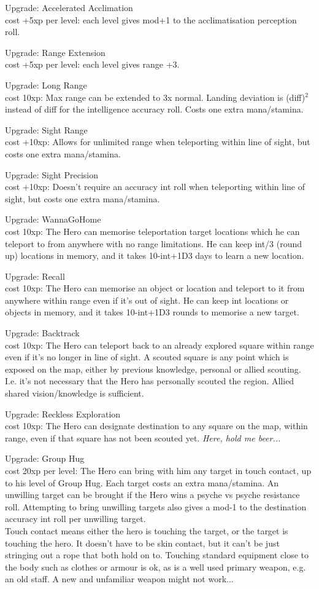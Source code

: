 Upgrade: Accelerated Acclimation\\
cost +5xp per level: each level gives mod+1 to the acclimatisation perception roll.

Upgrade: Range Extension\\
cost +5xp per level: each level gives range +3.

Upgrade: Long Range\\
cost 10xp: Max range can be extended to 3x normal. Landing deviation is (diff)$^2$ instead of diff for the intelligence accuracy roll. Costs one extra mana/stamina.

Upgrade: Sight Range\\
cost +10xp: Allows for unlimited range when teleporting within line of sight, but costs one extra mana/stamina.

Upgrade: Sight Precision\\
cost +10xp: Doesn't require an accuracy int roll when teleporting within line of sight, but costs one extra mana/stamina.

Upgrade: WannaGoHome\\
cost 10xp: The Hero can memorise teleportation target locations which he can teleport to from anywhere with no range limitations. He can keep int/3 (round up) locations in memory, and it takes 10-int+1D3 days to learn a new location.

Upgrade: Recall\\
cost 10xp: The Hero can memorise an object or location and teleport to it from anywhere within range even if it's out of sight. He can keep int locations or objects in memory, and it takes 10-int+1D3 rounds to memorise a new target.

Upgrade: Backtrack\\
cost 10xp: The Hero can teleport back to an already explored square within range even if it's no longer in line of sight. A scouted square is any point which is exposed on the map, either by previous knowledge, personal or allied scouting. I.e. it's not necessary that the Hero has personally scouted the region. Allied shared vision/knowledge is sufficient.

Upgrade: Reckless Exploration\\
cost 10xp: The Hero can designate destination to any square on the map, within range, even if that square has not been scouted yet. \emph{Here, hold me beer...}

Upgrade: Group Hug\\
cost 20xp per level: The Hero can bring with him any target in touch contact, up to his level of Group Hug. Each target costs an extra mana/stamina. An unwilling target can be brought if the Hero wins a psyche vs psyche resistance roll. Attempting to bring unwilling targets also gives a mod-1 to the destination accuracy int roll per unwilling target.\\
Touch contact means either the hero is touching the target, or the target is touching the hero. It doesn't have to be skin contact, but it can't be just stringing out a rope that both hold on to. Touching standard equipment close to the body such as clothes or armour is ok, as is a well used primary weapon, e.g. an old staff. A new and unfamiliar weapon might not work...


